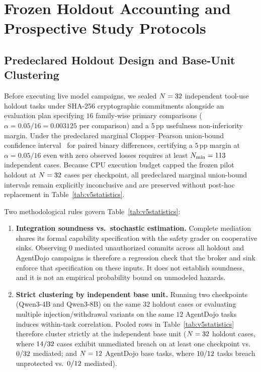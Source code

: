 \section{Frozen Holdout Accounting and Prospective Study Protocols}\label{app:holdout}

\subsection{Predeclared Holdout Design and Base-Unit Clustering}

Before executing live model campaigns, we sealed \(N = 32\) independent tool-use holdout tasks under SHA-256 cryptographic commitments alongside an evaluation plan specifying \(16\) family-wise primary comparisons (\(\alpha = 0.05/16 = 0.003125\) per comparison) and a \(5\)\,pp usefulness non-inferiority margin. Under the predeclared marginal Clopper--Pearson union-bound confidence interval~\cite{clopper,tango1998} for paired binary differences, certifying a \(5\)\,pp margin at \(\alpha = 0.05/16\) even with zero observed losses requires at least \(N_{\min} = 113\) independent cases. Because CPU execution budget capped the frozen pilot holdout at \(N = 32\) cases per checkpoint, all predeclared marginal union-bound intervals remain explicitly inconclusive and are preserved without post-hoc replacement in Table~\ref{tab:v5statistics}.



Two methodological rules govern Table~\ref{tab:v5statistics}:
\begin{enumerate}
  \item \textbf{Integration soundness vs.\ stochastic estimation.} Complete mediation shares its formal capability specification with the safety grader on cooperative sinks. Observing \(0\) mediated unauthorized commits across all holdout and AgentDojo campaigns is therefore a regression check that the broker and sink enforce that specification on these inputs. It does not establish soundness, and it is not an empirical probability bound on unmodeled hazards.
  \item \textbf{Strict clustering by independent base unit.} Running two checkpoints (Qwen3-4B and Qwen3-8B) on the same \(32\) holdout cases or evaluating multiple injection/withdrawal variants on the same \(12\) AgentDojo tasks induces within-task correlation. Pooled rows in Table~\ref{tab:v5statistics} therefore cluster strictly at the independent base unit (\(N = 32\) holdout cases, where \(14/32\) cases exhibit unmediated breach on at least one checkpoint vs.\ \(0/32\) mediated; and \(N = 12\) AgentDojo base tasks, where \(10/12\) tasks breach unprotected vs.\ \(0/12\) mediated).
\end{enumerate}

